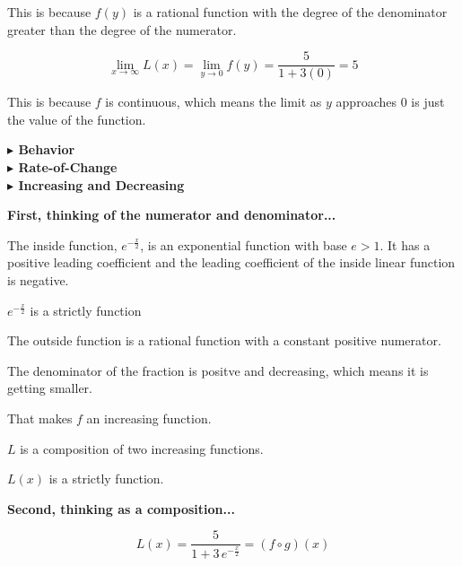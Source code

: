 \documentclass{ximera}
\begin{document}
This is because $f(y)$ is a rational function with the degree of the denominator greater than the degree of the numerator. 






\[  
\lim\limits_{x \to \infty}L(x) = \lim\limits_{y \to 0}f(y) = \frac{5}{1 + 3 (0)} = 5
\]



This is because $f$ is continuous, which means the limit as $y$ approaches $0$ is just the value of the function. 












\textbf{\textcolor{blue!55!black}{$\blacktriangleright$ Behavior}} \\
\textbf{\textcolor{blue!55!black}{$\blacktriangleright$ Rate-of-Change}} \\
\textbf{\textcolor{blue!55!black}{$\blacktriangleright$ Increasing and Decreasing}}







\textbf{First, thinking of the numerator and denominator...}

The inside function, $e^{-\tfrac{x}{2}}$, is an exponential function with base $e > 1$.  It has a positive leading coefficient and the leading coefficient of the inside linear function is negative. 


$e^{-\tfrac{x}{2}}$ is a strictly   function 


The outside function is a rational function with a constant positive numerator. 

The denominator of the fraction is positve and decreasing, which means it is getting smaller. 

That makes $f$ an increasing function. 


$L$ is a composition of two increasing functions. 


$L(x)$ is a strictly   function.




\textbf{Second, thinking as a composition...}



\[   L(x) = \frac{5}{1 + 3 \, e^{-\tfrac{x}{2}}} = (f \circ g)(x)\]
\end{document}
